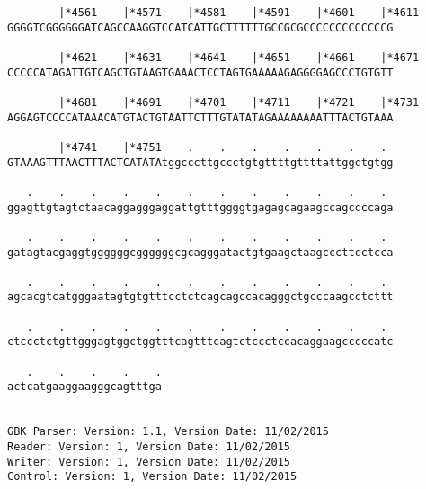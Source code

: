\documentclass{article}
\begin{document}
\begin{Verbatim}
        |*4561    |*4571    |*4581    |*4591    |*4601    |*4611
GGGGTCGGGGGGATCAGCCAAGGTCCATCATTGCTTTTTTGCCGCGCCCCCCCCCCCCCG
                                                            
        |*4621    |*4631    |*4641    |*4651    |*4661    |*4671
CCCCCATAGATTGTCAGCTGTAAGTGAAACTCCTAGTGAAAAAGAGGGGAGCCCTGTGTT
                                                            
        |*4681    |*4691    |*4701    |*4711    |*4721    |*4731
AGGAGTCCCCATAAACATGTACTGTAATTCTTTGTATATAGAAAAAAAATTTACTGTAAA
                                                            
        |*4741    |*4751    .    .    .    .    .    .    . 
GTAAAGTTTAACTTTACTCATATAtggcccttgccctgtgttttgttttattggctgtgg
                                                            
   .    .    .    .    .    .    .    .    .    .    .    . 
ggagttgtagtctaacaggagggaggattgtttggggtgagagcagaagccagccccaga
                                                            
   .    .    .    .    .    .    .    .    .    .    .    . 
gatagtacgaggtggggggcggggggcgcagggatactgtgaagctaagcccttcctcca
                                                            
   .    .    .    .    .    .    .    .    .    .    .    . 
agcacgtcatgggaatagtgtgtttcctctcagcagccacagggctgcccaagcctcttt
                                                            
   .    .    .    .    .    .    .    .    .    .    .    . 
ctccctctgttgggagtggctggtttcagtttcagtctccctccacaggaagcccccatc
                                                            
   .    .    .    .    .
actcatgaaggaagggcagtttga
                        
                        
GBK Parser: Version: 1.1, Version Date: 11/02/2015
Reader: Version: 1, Version Date: 11/02/2015
Writer: Version: 1, Version Date: 11/02/2015
Control: Version: 1, Version Date: 11/02/2015
\end{Verbatim}
\end{document}
